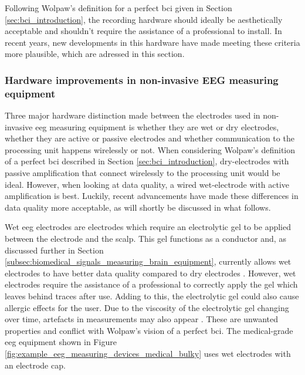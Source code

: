 Following Wolpaw's definition for a perfect \gls{bci} given in Section \ref{sec:bci_introduction}, the recording hardware should ideally be aesthetically acceptable and shouldn't require the assistance of a professional to install.
In recent years, new developments in this hardware have made meeting these criteria more plausible, which are adressed in this section.


\subsubsection{Hardware improvements in non-invasive EEG measuring equipment}
\label{subsubsec:bci_gaining_popularity_better_measuring_hardware}

Three major hardware distinction made between the electrodes used in non-invasive \gls{eeg} measuring equipment is whether they are wet or dry electrodes, whether they are active or passive electrodes and whether communication to the processing unit happens wirelessly or not.
When considering Wolpaw's definition of a perfect \gls{bci} described in Section \ref{sec:bci_introduction}, dry-electrodes with passive amplification that connect wirelessly to the processing unit would be ideal.
However, when looking at data quality, a wired wet-electrode with active amplification is best.
Luckily, recent advancements have made these differences in data quality more acceptable, as will shortly be discussed in what follows.

Wet \gls{eeg} electrodes are electrodes which require an electrolytic gel to be applied between the electrode and the scalp.
This gel functions as a conductor and, as discussed further in Section \ref{subsec:biomedical_signals_measuring_brain_equipment}, currently allows wet electrodes to have better data quality compared to dry electrodes \citep{wet_vs_dry, dry_electrode_status, wet_dry_comparison_experiment}.
However, wet electrodes require the assistance of a professional to correctly apply the gel which leaves behind traces after use.
Adding to this, the electrolytic gel could also cause allergic effects for the user. Due to the viscosity of the electrolytic gel changing over time, artefacts in measurements may also appear \citep{dry_electrode_status}.
These are unwanted properties and conflict with Wolpaw's vision of a perfect \gls{bci}.
The medical-grade \gls{eeg} equipment shown in Figure \ref{fig:example_eeg_measuring_devices_medical_bulky} uses wet electrodes with an electrode cap.

